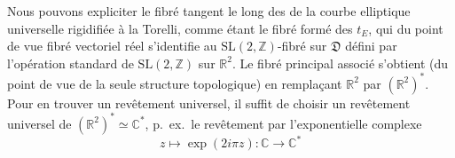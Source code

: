 \documentclass[11pt,a4paper]{article}
\begin{document}
Nous pouvons expliciter le fibré tangent le long des   de la
courbe elliptique universelle rigidifiée à la Torelli, comme étant le fibré formé des $t_E$, qui
du point de vue fibré vectoriel réel s'identifie au  $\mathrm{SL}(2, \mathbb{Z})$-fibré
sur $\mathfrak{D}$ défini par l'opération standard de $\mathrm{SL}(2, \mathbb{Z})$ sur $\mathbb{R}^2$.
Le fibré principal associé  s'obtient (du point de vue de la seule structure
topologique) en remplaçant   $\mathbb{R}^2$ par
$(\mathbb{R}^2)^*$. Pour en trouver un revêtement universel, il suffit de choisir un revêtement
universel de $(\mathbb{R}^2)^* \simeq \mathbb{C}^*$, p.\ ex.\ le revêtement par l'exponentielle
complexe
\[
  z \longmapsto \exp(2 i \pi z) : \mathbb{C} \longrightarrow \mathbb{C}^*
\]
\end{document}
